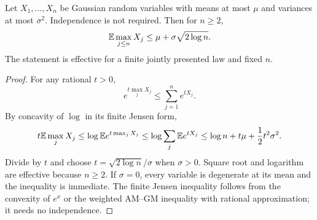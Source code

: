 \begin{theorem}\label{thm:expected-max}
Let $X_1,\dots,X_n$ be Gaussian random variables with means at most $\mu$ and variances at most $\sigma^2$.  Independence is not required.  Then for $n\ge2$,
\begin{equation}\label{eq:expected-max}
 \mathbb E\max_{j\le n}X_j\le \mu+\sigma\sqrt{2\log n}.
\end{equation}
The statement is effective for a finite jointly presented law and fixed $n$.
\end{theorem}

\begin{proof}
For any rational $t>0$,
\[
 e^{t\max_jX_j}\le\sum_{j=1}^ne^{tX_j}.
\]
By concavity of $\log$ in its finite Jensen form,
\[
 t\mathbb E\max_jX_j
 \le \log\mathbb E e^{t\max_jX_j}
 \le \log\sum_j\mathbb E e^{tX_j}
 \le \log n+t\mu+\frac12t^2\sigma^2.
\]
Divide by $t$ and choose $t=\sqrt{2\log n}/\sigma$ when $\sigma>0$.  Square root and logarithm are effective because $n\ge2$.  If $\sigma=0$, every variable is degenerate at its mean and the inequality is immediate.  The finite Jensen inequality follows from the convexity of $e^x$ or the weighted AM--GM inequality with rational approximation; it needs no independence.
\end{proof}
